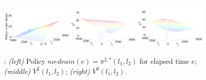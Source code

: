 \begin{figure}[tbp!]
\centering
\includegraphics[width=0.3\textwidth]{new_pics/policy-iteration2-3.pdf}
\includegraphics[width=0.3\textwidth]{new_pics/V2.pdf}
\includegraphics[width=0.3\textwidth]{new_pics/V9.pdf}
\vspace{-3mm}
\caption{\footnotesize 
\WaterReservoir: 
{\it (left)} Policy $\mathit{no}$-$\mathit{drain}(e)=\pi^{2,*}(l_1,l_2)$ 
for elapsed time $e$; 
{\it (middle)} $V^2(l_1,l_2)$; 
{\it (right)} $V^9(l_1,l_2)$.
}
\label{fig:v2plots}
\end{figure}


